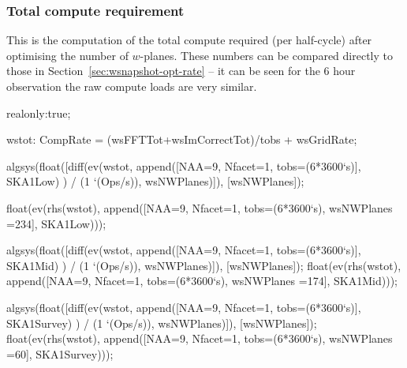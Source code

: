 \documentclass[useAMS,usenatbib,referee]{article}
\begin{document}
\subsubsection{Total compute requirement}

This is the computation of the total compute required (per half-cycle)
after optimising the number of $w$-planes. These numbers can be
compared directly to those in Section~\ref{sec:wsnapshot-opt-rate} --
it can be seen for the 6 hour observation the raw compute loads are
very similar. 

\begin{maxima}[]

realonly:true;

wstot: CompRate = (wsFFTTot+wsImCorrectTot)/tobs + wsGridRate;

algsys(float([diff(ev(wstot, append([NAA=9, Nfacet=1, tobs=(6*3600`s)], SKA1Low) ) / (1 `(Ops/s)), wsNWPlanes)]), [wsNWPlanes]);

float(ev(rhs(wstot), append([NAA=9, Nfacet=1, tobs=(6*3600`s), wsNWPlanes =234], SKA1Low)));

algsys(float([diff(ev(wstot, append([NAA=9, Nfacet=1, tobs=(6*3600`s)], SKA1Mid) ) / (1 `(Ops/s)), wsNWPlanes)]), [wsNWPlanes]);
float(ev(rhs(wstot), append([NAA=9, Nfacet=1, tobs=(6*3600`s), wsNWPlanes =174], SKA1Mid)));

algsys(float([diff(ev(wstot, append([NAA=9, Nfacet=1, tobs=(6*3600`s)], SKA1Survey) ) / (1 `(Ops/s)), wsNWPlanes)]), [wsNWPlanes]);
float(ev(rhs(wstot), append([NAA=9, Nfacet=1, tobs=(6*3600`s), wsNWPlanes =60], SKA1Survey)));




\end{maxima}
\end{document}
